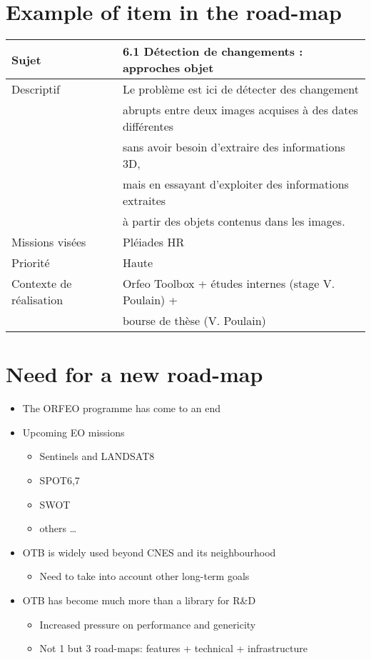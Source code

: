 \documentclass[8pt]{beamer}
\begin{document}
\section{Example of item in the road-map}
\label{sec-3}
\begin{center}
\begin{tabular}{ll}
Sujet & 6.1 Détection de changements : approches objet\\
\hline
Descriptif & Le problème est ici de détecter des changement\\
 & abrupts entre deux images acquises à des dates différentes\\
 & sans avoir besoin d'extraire des informations 3D,\\
 & mais en essayant d'exploiter des informations extraites\\
 & à partir des objets contenus dans les images.\\
\hline
Missions visées & Pléiades HR\\
\hline
Priorité & Haute\\
\hline
Contexte de réalisation & Orfeo Toolbox + études internes (stage V. Poulain) +\\
 & bourse de thèse (V. Poulain)\\
\hline
\end{tabular}
\end{center}


\section{Need for a new road-map}
\label{sec-4}
\begin{itemize}
\item The ORFEO programme has come to an end
\item Upcoming EO missions
\begin{itemize}
\item Sentinels and LANDSAT8
\item SPOT6,7
\item SWOT
\item others \ldots{}
\end{itemize}
\item OTB is widely used beyond CNES and its neighbourhood
\begin{itemize}
\item Need to take into account other long-term goals
\end{itemize}
\item OTB has become much more than a library for R\&D
\begin{itemize}
\item Increased pressure on performance and genericity
\item Not 1 but 3 road-maps: features + technical + infrastructure
\end{itemize}
\end{itemize}
\end{document}
